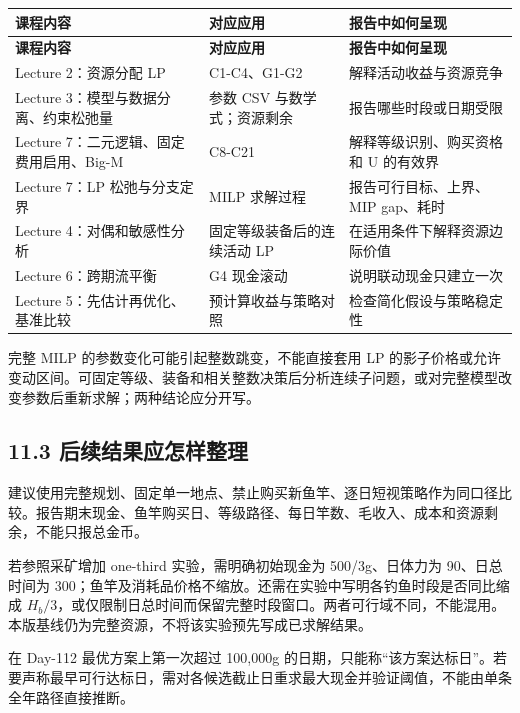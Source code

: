 \documentclass[11pt,a4paper]{article}
\begin{document}
{\small\begin{longtable}{L{0.3\dimexpr\textwidth-30pt\relax}L{0.26\dimexpr\textwidth-30pt\relax}L{0.44\dimexpr\textwidth-30pt\relax}}\toprule
\textbf{课程内容} & \textbf{对应应用} & \textbf{报告中如何呈现}\\\midrule\endfirsthead
\textbf{课程内容} & \textbf{对应应用} & \textbf{报告中如何呈现}\\\midrule\endhead
\bottomrule\endfoot
Lecture 2：资源分配 LP & C1-C4、G1-G2 & 解释活动收益与资源竞争\\
Lecture 3：模型与数据分离、约束松弛量 & 参数 CSV 与数学式；资源剩余 & 报告哪些时段或日期受限\\
Lecture 7：二元逻辑、固定费用启用、Big-M & C8-C21 & 解释等级识别、购买资格和 U 的有效界\\
Lecture 7：LP 松弛与分支定界 & MILP 求解过程 & 报告可行目标、上界、MIP gap、耗时\\
Lecture 4：对偶和敏感性分析 & 固定等级装备后的连续活动 LP & 在适用条件下解释资源边际价值\\
Lecture 6：跨期流平衡 & G4 现金滚动 & 说明联动现金只建立一次\\
Lecture 5：先估计再优化、基准比较 & 预计算收益与策略对照 & 检查简化假设与策略稳定性\\
\end{longtable}}

完整 MILP 的参数变化可能引起整数跳变，不能直接套用 LP 的影子价格或允许变动区间。可固定等级、装备和相关整数决策后分析连续子问题，或对完整模型改变参数后重新求解；两种结论应分开写。\par

\subsection*{11.3 后续结果应怎样整理}

建议使用完整规划、固定单一地点、禁止购买新鱼竿、逐日短视策略作为同口径比较。报告期末现金、鱼竿购买日、等级路径、每日竿数、毛收入、成本和资源剩余，不能只报总金币。\par

若参照采矿增加 one-third 实验，需明确初始现金为 500/3g、日体力为 90、日总时间为 300；鱼竿及消耗品价格不缩放。还需在实验中写明各钓鱼时段是否同比缩成 $H_b/3$，或仅限制日总时间而保留完整时段窗口。两者可行域不同，不能混用。本版基线仍为完整资源，不将该实验预先写成已求解结果。\par

在 Day-112 最优方案上第一次超过 100,000g 的日期，只能称“该方案达标日”。若要声称最早可行达标日，需对各候选截止日重求最大现金并验证阈值，不能由单条全年路径直接推断。\par
\end{document}
